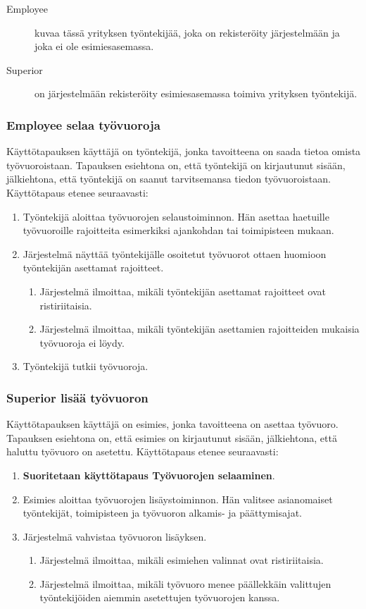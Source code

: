 \documentclass[10pt,titlepage,hidelinks]{scrartcl}
\begin{document}
\begin{description}
\item[Employee] kuvaa tässä yrityksen työntekijää, joka on rekisteröity järjestelmään ja joka ei ole esimiesasemassa.
\item[Superior] on järjestelmään rekisteröity esimiesasemassa toimiva yrityksen työntekijä.
\end{description}

\subsubsection*{Employee selaa työvuoroja}

Käyttötapauksen käyttäjä on työntekijä, jonka tavoitteena on saada tietoa omista työvuoroistaan. Tapauksen esiehtona on, että työntekijä on kirjautunut sisään, jälkiehtona, että työntekijä on saanut tarvitsemansa tiedon työvuoroistaan. Käyttötapaus etenee seuraavasti: \begin{enumerate}
\item Työntekijä aloittaa työvuorojen selaustoiminnon. Hän asettaa haetuille työvuoroille rajoitteita esimerkiksi ajankohdan tai toimipisteen mukaan.
\item Järjestelmä näyttää työntekijälle osoitetut työvuorot ottaen huomioon työntekijän asettamat rajoitteet. \begin{enumerate}
\item Järjestelmä ilmoittaa, mikäli työntekijän asettamat rajoitteet ovat ristiriitaisia.
\item Järjestelmä ilmoittaa, mikäli työntekijän asettamien rajoitteiden mukaisia työvuoroja ei löydy.
\end{enumerate}
\item Työntekijä tutkii työvuoroja.
\end{enumerate}

\subsubsection*{Superior lisää työvuoron}

Käyttötapauksen käyttäjä on esimies, jonka tavoitteena on asettaa työvuoro. Tapauksen esiehtona on, että esimies on kirjautunut sisään, jälkiehtona, että haluttu työvuoro on asetettu. Käyttötapaus etenee seuraavasti: \begin{enumerate}
\item \textbf{Suoritetaan käyttötapaus Työvuorojen selaaminen}.
\item Esimies aloittaa työvuorojen lisäystoiminnon. Hän valitsee asianomaiset työntekijät, toimipisteen ja työvuoron alkamis- ja päättymisajat.
\item Järjestelmä vahvistaa työvuoron lisäyksen. \begin{enumerate}
\item Järjestelmä ilmoittaa, mikäli esimiehen valinnat ovat ristiriitaisia.
\item Järjestelmä ilmoittaa, mikäli työvuoro menee päällekkäin valittujen työntekijöiden aiemmin asetettujen työvuorojen kanssa.
\end{enumerate}
\end{enumerate}
\end{document}
